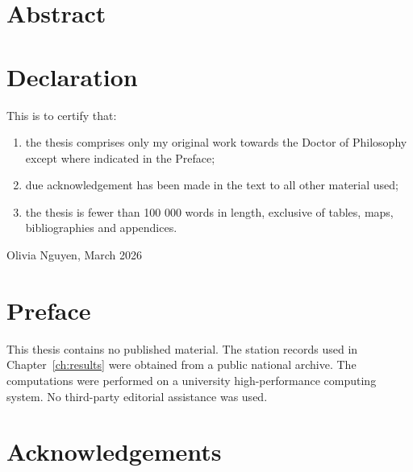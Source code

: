 \documentclass[12pt,oneside,a4paper]{report}
\begin{document}

\setcounter{page}{2}
\chapter*{Abstract}

\clearpage
\chapter*{Declaration}
This is to certify that:
\begin{enumerate}[label=\roman*.]
\item the thesis comprises only my original work towards the Doctor of Philosophy except where indicated in the Preface;
\item due acknowledgement has been made in the text to all other material used;
\item the thesis is fewer than 100 000 words in length, exclusive of tables, maps, bibliographies and appendices.
\end{enumerate}
\vspace{1in}
\noindent Olivia Nguyen, March 2026
\clearpage
\chapter*{Preface}
This thesis contains no published material. The station records used in
Chapter~\ref{ch:results} were obtained from a public national archive. The computations were
performed on a university high-performance computing system. No third-party editorial
assistance was used.
\clearpage
\chapter*{Acknowledgements}

\clearpage
\tableofcontents
\listoffigures
\listoftables
\clearpage
{}









\appendix

\end{document}
